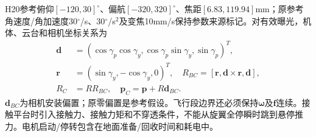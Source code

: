 \noindent H20参考俯仰$[-120,30]^\circ$、偏航$[-320,320]^\circ$、焦距$[6.83,119.94]$mm；原参考角速度/角加速度30$^\circ$/s、30$^\circ$/s$^2$及变焦10mm/s保持参数来源标记。对有效曝光，机体、云台和相机坐标关系为
\begin{align}
 \mathbf d&=(\cos\gamma_p\cos\gamma_y,\cos\gamma_p\sin\gamma_y,\sin\gamma_p)^T,\\
 \mathbf r&=(\sin\gamma_y,-\cos\gamma_y,0)^T,\quad
 R_{BC}=[\mathbf r,\mathbf d\times\mathbf r,\mathbf d],\\
 R_C&=RR_{BC},\quad \mathbf p_C=\mathbf p+R\mathbf d_{BC}.
 \label{eng:eq:cameraaxes}
\end{align}
\noindent $\mathbf d_{BC}$为相机安装偏置；原零偏置是参考假设。飞行段边界还必须保持$\boldsymbol\omega$及$\mathbf f$连续。接触平台时引入接触力、接触力矩和不穿透条件，不能从旋翼全停瞬时跳到悬停推力。电机启动/停转包含在地面准备/回收时间和耗电中。
\clearpage
